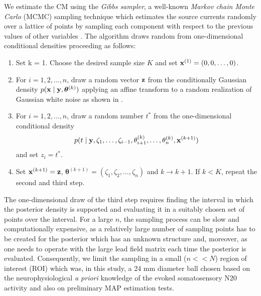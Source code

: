 \documentclass[5p]{elsarticle}
\begin{document}
We estimate the CM using the {\em Gibbs sampler}, a well-known {\em Markov chain Monte Carlo} (MCMC) sampling technique \cite{kaipio2004} which estimates the source currents randomly over a lattice of points  \cite{spitzer1971markov} by sampling each component with respect to the previous values of other variables \cite{murphy2012machine}. The algorithm draws random from one-dimensional conditional densities proceeding as follows:
\begin{enumerate}
\item Set k = 1. Choose the desired sample size $K$ and set ${\bf x}^{(1)} = (0, 0, \ldots, 0)$. 
\item For $i = 1, 2, \ldots, n$, draw a random vector ${\bf z}$ from the conditionally Gaussian density $p({\bf x} \mid {\bf y}, {\bm \theta}^{(k)})$ applying an affine transform to a random realization of Gaussian white noise as shown in \cite{calvetti2009}. 
\item For $i = 1, 2, \ldots, n$, draw a random number ${t}^\ast$ from the one-dimensional conditional density \[ p(t \mid {\bf y}, \zeta_1, \ldots, \zeta_{i-1}, \theta^{(k)}_{i+1}, \ldots, \theta^{(k)}_n, {\bf x}^{(k+1)}) \] and set $z_i = t^\ast$.
\item Set ${\bf x}^{(k+1)} = {\bf z}$, ${\bm \theta}^{(k+1)}  = (\zeta_1, \zeta_2, \ldots, \zeta_n)$  and $k \to k + 1$. If $k < K$, repeat the second and third step. 
\end{enumerate}

The one-dimensional draw of the third step requires finding the interval in which the posterior density is supported and evaluating it in a suitably chosen set of points over the interval. For a large $n$, the sampling process can be slow and computationally expensive, as a relatively large number of sampling points has to be created for the posterior which has an unknown structure and, moreover, as one needs to operate with the large lead field matrix each time the posterior is evaluated. Consequently, we limit the sampling in a small ($n <<N$) region of interest (ROI) which was, in this study, a 24 mm diameter ball chosen based on the neurophysiological {\em a priori} knowledge of the evoked somatosensory N20 activity and also on preliminary MAP estimation tests.  
\end{document}
